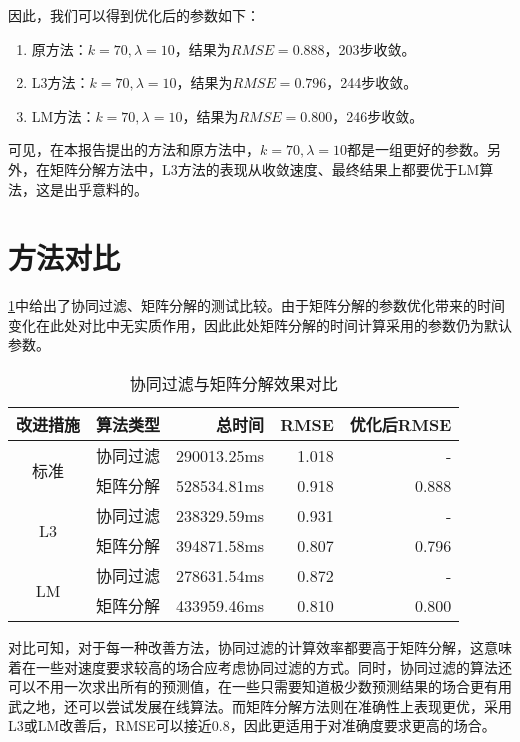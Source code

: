 \documentclass[a4paper,12pt]{article}
\begin{document}
    因此，我们可以得到优化后的参数如下：
    \begin{enumerate}
      \item 原方法：$k=70,\lambda=10$，结果为$RMSE=0.888$，203步收敛。
      \item L3方法：$k=70,\lambda=10$，结果为$RMSE=0.796$，244步收敛。
      \item LM方法：$k=70,\lambda=10$，结果为$RMSE=0.800$，246步收敛。
    \end{enumerate}

    可见，在本报告提出的方法和原方法中，$k=70,\lambda=10$都是一组更好的参数。另外，在矩阵分解方法中，L3方法的表现从收敛速度、最终结果上都要优于LM算法，这是出乎意料的。
    \section{方法对比}
    \cref{tbl:hwcompare}中给出了协同过滤、矩阵分解的测试比较。由于矩阵分解的参数优化带来的时间变化在此处对比中无实质作用，因此此处矩阵分解的时间计算采用的参数仍为默认参数。

    \begin{table}[htbp]
      \centering
      \caption{协同过滤与矩阵分解效果对比}
      \label{tbl:hwcompare}
      \begin{tabular}{ccrrr}
      \toprule
      改进措施 & 算法类型 & 总时间 & RMSE & 优化后RMSE \\
      \midrule
      \multirow{2}{*}{标准} & 协同过滤 &  290013.25ms & 1.018 & -\\
                           & 矩阵分解 &  528534.81ms & 0.918 & 0.888 \\
      \cline{1-5}
      \multirow{2}{*}{L3} & 协同过滤 &  238329.59ms & 0.931 & - \\
                           & 矩阵分解 &  394871.58ms & 0.807 & 0.796 \\
      \cline{1-5}
      \multirow{2}{*}{LM} & 协同过滤 &  278631.54ms & 0.872 & - \\
                           & 矩阵分解 &  433959.46ms & 0.810 & 0.800 \\
      \cline{1-5}
      \end{tabular}
    \end{table}

    对比可知，对于每一种改善方法，协同过滤的计算效率都要高于矩阵分解，这意味着在一些对速度要求较高的场合应考虑协同过滤的方式。同时，协同过滤的算法还可以不用一次求出所有的预测值，在一些只需要知道极少数预测结果的场合更有用武之地，还可以尝试发展在线算法。而矩阵分解方法则在准确性上表现更优，采用L3或LM改善后，RMSE可以接近0.8，因此更适用于对准确度要求更高的场合。

    \label{applastpage}
\iffalse
\begin{itemize}[noitemsep,topsep=0pt]
\end{itemize}
\begin{enumerate}[label=\Roman{*}.,noitemsep,topsep=0pt]
\end{enumerate}
\begin{multicols}{2}
\end{multicols}
\fi
\end{document}
